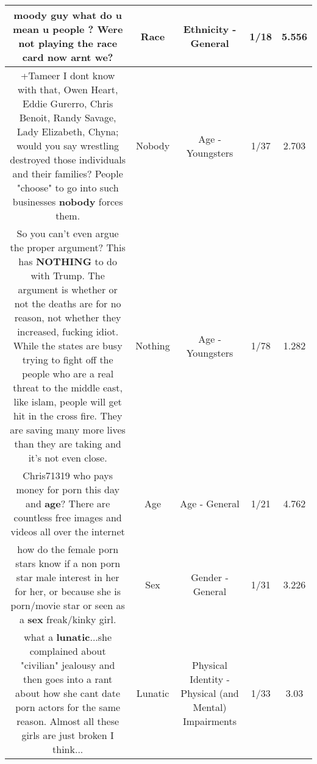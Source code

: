 \documentclass[11pt]{article}
\newlength\mylength
\begin{document}
\begin{center}
\begin{longtable}{|C{.65\mylength}|C{.30\mylength}|C{.12\mylength}|C{.12\mylength}|C{.12\mylength}|}
  \small moody guy  what do u mean u people ? Were not playing the \textbf{race} card now arnt we?\normalsize   & Race & Ethnicity - General & 1/18 & 5.556 \\  \hline
  \small +Tameer  I dont know with that, Owen Heart, Eddie Gurerro, Chris Benoit, Randy Savage, Lady Elizabeth, Chyna; would you say wrestling destroyed those individuals and their families? People "choose" to go into such businesses \textbf{nobody} forces them.\normalsize   & Nobody & Age - Youngsters & 1/37 & 2.703 \\  \hline
  \small So you can't even argue the proper argument? This has \textbf{NOTHING} to do with Trump. The argument is whether or not the deaths are for no reason, not whether they increased, fucking idiot. While the states are busy trying to fight off the people who are a real threat to the middle east, like islam, people will get hit in the cross fire. They are saving many more lives than they are taking and it's not even close.\normalsize   & Nothing & Age - Youngsters & 1/78 & 1.282 \\  \hline
  \small Chris71319 who pays money for porn this day and \textbf{age}? There are countless free images and videos all over the internet\normalsize   & Age & Age - General & 1/21 & 4.762 \\  \hline
  \small how do the female porn stars know if a non porn star male interest in her for her, or because she is porn/movie star or seen as a \textbf{sex} freak/kinky girl.\normalsize   & Sex & Gender - General & 1/31 & 3.226 \\  \hline
  \small what a \textbf{lunatic}...she complained about "civilian" jealousy and then goes into a rant about how she cant date porn actors for the same reason.  Almost all these girls are just broken I think...\normalsize   & Lunatic & Physical Identity - Physical (and Mental) Impairments & 1/33 & 3.03 \\  \hline

\end{longtable}
\end{center}
\end{document}
